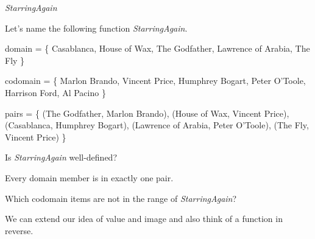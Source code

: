\documentclass{ximera}
\begin{document}
\begin{example} \textit{StarringAgain}

Let's name the following function \textit{StarringAgain}.

domain = \{ Casablanca, House of Wax,  The Godfather, Lawrence of Arabia, The Fly \}

codomain = \{ Marlon Brando, Vincent Price, Humphrey Bogart, Peter O'Toole, Harrison Ford, Al Pacino \}

pairs = \{ (The Godfather, Marlon Brando), (House of Wax, Vincent Price), (Casablanca, Humphrey Bogart), (Lawrence of Arabia, Peter O'Toole), (The Fly, Vincent Price) \} 





\begin{question}

Is \textit{StarringAgain} well-defined?

\begin{multipleChoice}
\end{multipleChoice}
\begin{feedback}
Every domain member is in exactly one pair.
\end{feedback}

\end{question}







\begin{question}

Which codomain items are not in the range of \textit{StarringAgain}?

\begin{selectAll}
\end{selectAll}

\end{question}





\end{example}







We can extend our idea of value and image and also think of a function in reverse. \\
\end{document}
